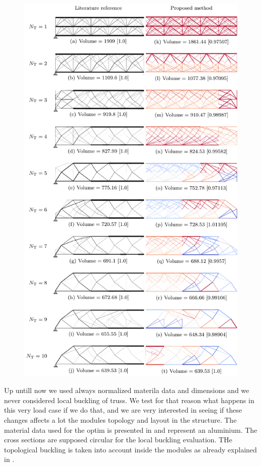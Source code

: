 \begin{figure}
    \centering
    \includegraphics{figures/06_DMO/00_tug_bench/bench.pdf}
    \caption{}
    \label{fig:00_tug_bench}
\end{figure}

Up untill now we used always normalized materila data and dimensions and we never considered local buckling of truss. We test for that reason what happens in this very load case if we do that, and we are very interested in seeing if these changes affects a lot the modules topology and layout in the structure. The material data used for the optim is presented in  and represent an aluminium. The cross sections are supposed circular for the local buckling evaluation. THe topological buckling is taken into account inside the modules as already explained in .


